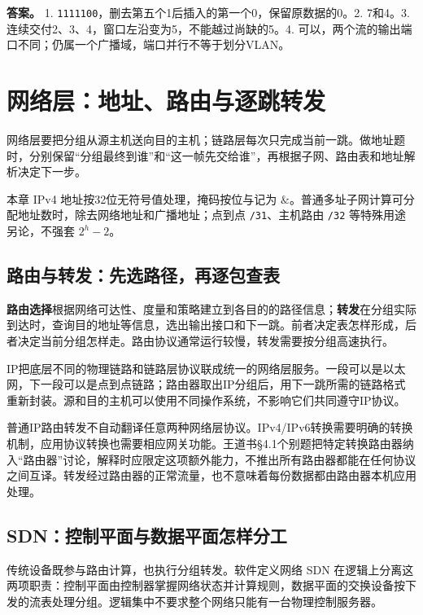 \textbf{答案。} 1. \allowbreak{}\texttt{1111100}，删去第五个1后插入的第一个0，保留原数据的0。2. 7和4。3. 连续交付2、3、4，窗口左沿变为5，不能越过尚缺的5。4. 可以，两个流的输出端口不同；仍属一个广播域，端口并行不等于划分VLAN。

\chapter{网络层：地址、路由与逐跳转发}\label{cn-ch4}

网络层要把分组从源主机送向目的主机；链路层每次只完成当前一跳。做地址题时，分别保留``分组最终到谁''和``这一帧先交给谁''，再根据子网、路由表和地址解析决定下一步。

本章 IPv4 地址按32位无符号值处理，掩码按位与记为 \(\&\)。普通多址子网计算可分配地址数时，除去网络地址和广播地址；点到点 \allowbreak{}\texttt{/31}、主机路由 \allowbreak{}\texttt{/32} 等特殊用途另论，不强套 \(2^h-2\)。

\section{路由与转发：先选路径，再逐包查表}\label{cn-04-01}

\textbf{路由选择}根据网络可达性、度量和策略建立到各目的的路径信息；\textbf{转发}在分组实际到达时，查询目的地址等信息，选出输出接口和下一跳。前者决定表怎样形成，后者决定当前分组怎样走。路由协议通常运行较慢，转发需要按分组高速执行。

IP把底层不同的物理链路和链路层协议联成统一的网络层服务。一段可以是以太网，下一段可以是点到点链路；路由器取出IP分组后，用下一跳所需的链路格式重新封装。源和目的主机可以使用不同操作系统，不影响它们共同遵守IP协议。

普通IP路由转发不自动翻译任意两种网络层协议。IPv4/IPv6转换需要明确的转换机制，应用协议转换也需要相应网关功能。王道书§4.1个别题把特定转换路由器纳入``路由器''讨论，解释时应限定这项额外能力，不推出所有路由器都能在任何协议之间互译。转发经过路由器的正常流量，也不意味着每份数据都由路由器本机应用处理。

\section{SDN：控制平面与数据平面怎样分工}\label{cn-04-02}

传统设备既参与路由计算，也执行分组转发。软件定义网络 SDN 在逻辑上分离这两项职责：控制平面由控制器掌握网络状态并计算规则，数据平面的交换设备按下发的流表处理分组。逻辑集中不要求整个网络只能有一台物理控制服务器。

